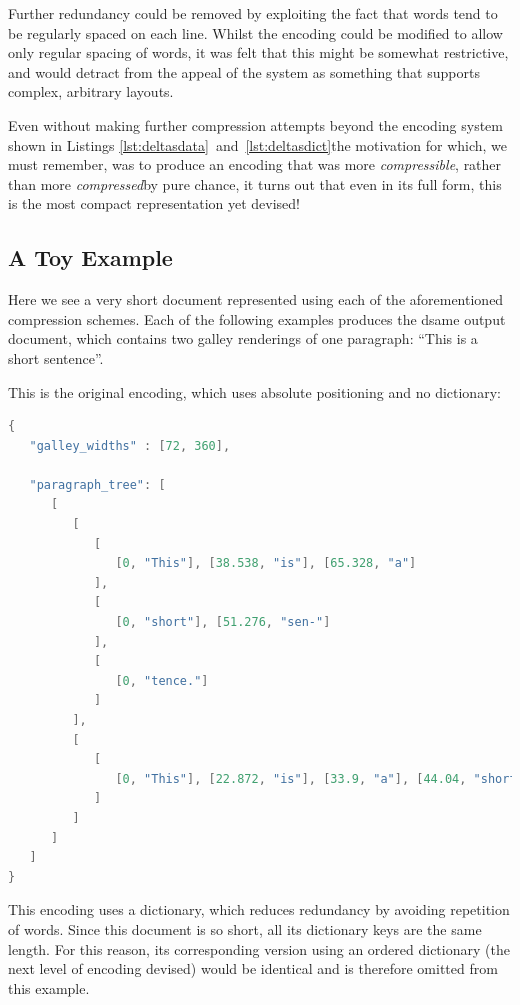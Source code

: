 Further redundancy could be removed by exploiting the fact that words tend to be regularly spaced on each line. Whilst the encoding could be modified to allow only regular spacing of words, it was felt that this might be somewhat restrictive, and would detract from the appeal of the system as something that supports complex, arbitrary layouts.

Even without making further compression attempts beyond the encoding system shown in Listings \ref{lst:deltasdata}~and~\ref{lst:deltasdict}\ed the motivation for which, we must remember, was to produce an encoding that was more \emph{compressible}, rather than more \emph{compressed}\ed by pure chance, it turns out that even in its full form, this is the most compact representation yet devised!

\clearpage
\subsection{A Toy Example}
Here we see a very short document represented using each of the aforementioned compression schemes. Each of the following examples produces the dsame output document, which contains two galley renderings of one paragraph: ``This is a short sentence''.

\vspace{0.5in}
This is the original encoding, which uses absolute positioning and no dictionary:

\vspace{0.5in}
\begin{lstlisting}[language=c,stringstyle=\color{blue},basicstyle=\ttfamily\footnotesize]
{
   "galley_widths" : [72, 360],

   "paragraph_tree": [
      [
         [
            [
               [0, "This"], [38.538, "is"], [65.328, "a"]
            ],
            [
               [0, "short"], [51.276, "sen-"]
            ],
            [
               [0, "tence."]
            ]
         ],
         [
            [
               [0, "This"], [22.872, "is"], [33.9, "a"], [44.04, "short"], [71.964, "sentence."]
            ]
         ]
      ]
   ]
}
\end{lstlisting}

\clearpage

This encoding uses a dictionary, which reduces redundancy by avoiding repetition of words. Since this document is so short, all its dictionary keys are the same length. For this reason, its corresponding version using an ordered dictionary (the next level of encoding devised) would be identical and is therefore omitted from this example.

